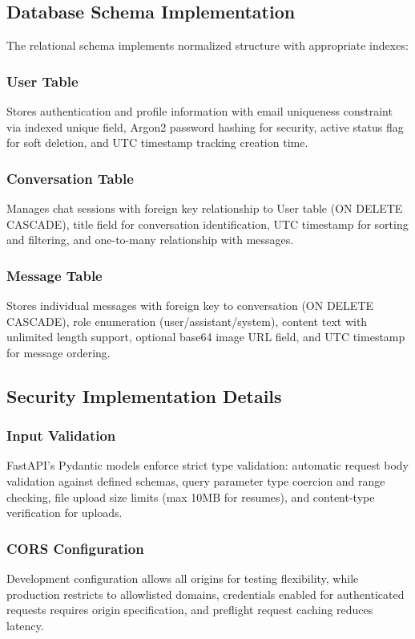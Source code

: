 \documentclass[conference]{IEEEtran}
\begin{document}
\subsection{Database Schema Implementation}

The relational schema implements normalized structure with appropriate indexes:

\subsubsection{User Table}
Stores authentication and profile information with email uniqueness constraint via indexed unique field, Argon2 password hashing for security, active status flag for soft deletion, and UTC timestamp tracking creation time.

\subsubsection{Conversation Table}
Manages chat sessions with foreign key relationship to User table (ON DELETE CASCADE), title field for conversation identification, UTC timestamp for sorting and filtering, and one-to-many relationship with messages.

\subsubsection{Message Table}
Stores individual messages with foreign key to conversation (ON DELETE CASCADE), role enumeration (user/assistant/system), content text with unlimited length support, optional base64 image URL field, and UTC timestamp for message ordering.

\subsection{Security Implementation Details}

\subsubsection{Input Validation}
FastAPI's Pydantic models enforce strict type validation: automatic request body validation against defined schemas, query parameter type coercion and range checking, file upload size limits (max 10MB for resumes), and content-type verification for uploads.

\subsubsection{CORS Configuration}
Development configuration allows all origins for testing flexibility, while production restricts to allowlisted domains, credentials enabled for authenticated requests  requires origin specification, and preflight request caching reduces latency.
\end{document}
